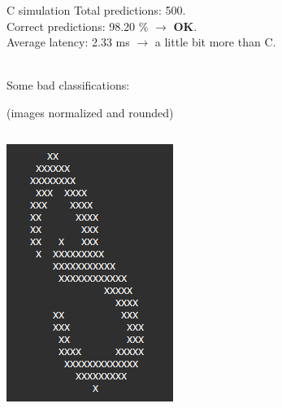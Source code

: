 \documentclass[10pt, xcolor=dvipsnames, compress]{beamer}
\begin{document}
\begin{frame}{C simulation}
    Total predictions: 500.\\
    Correct predictions: 98.20 \% \hspace*{1em} $\rightarrow$ \textbf{OK}.\\
    Average latency: 2.33 ms \hspace*{1em} $\rightarrow$ a little bit
        more than C.\\~\

    Some bad classifications:

    {\scriptsize (images normalized and rounded)}\\[2ex]

    \begin{spacing}{0.9}
    \begin{columns}[T]
        \begin{column}{.15\textwidth}
            \includegraphics[width=\textwidth]{3-bad-class.png}

\end{column}
\end{columns}
\end{spacing}
\end{frame}
\end{document}
